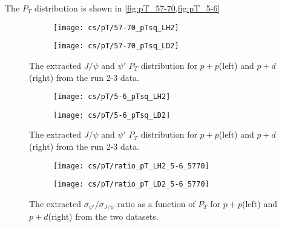 \documentclass[../main.tex]{subfiles}
\begin{document}
The $P_T$ distribution is shown in \cref{fig:pT_57-70,fig:pT_5-6}
\begin{figure}[h!]
	\centering
	\begin{subfigure}{0.45\linewidth}
		\texttt{[image: cs/pT/57-70\_pTsq\_LH2]}
	\end{subfigure}
	\begin{subfigure}{0.45\linewidth}
		\texttt{[image: cs/pT/57-70\_pTsq\_LD2]}
	\end{subfigure}
	\caption{The extracted $J/\psi$ and $\psi'$ $P_T$ distribution for $p+p$(left)
		and $p+d$(right) from the run 2-3 data.}
	\label{fig:pT_57-70}
\end{figure}
\begin{figure}[h!]
	\centering
	\begin{subfigure}{0.45\linewidth}
		\texttt{[image: cs/pT/5-6\_pTsq\_LH2]}
	\end{subfigure}
	\begin{subfigure}{0.45\linewidth}
		\texttt{[image: cs/pT/5-6\_pTsq\_LD2]}
	\end{subfigure}
	\caption{The extracted $J/\psi$ and $\psi'$ $P_T$ distribution for $p+p$(left)
		and $p+d$(right) from the run 2-3 data.}
	\label{fig:pT_5-6}
\end{figure}
\begin{figure}[h!]
	\centering
	\begin{subfigure}{0.45\linewidth}
		\texttt{[image: cs/pT/ratio\_pT\_LH2\_5-6\_5770]}
	\end{subfigure}
	\begin{subfigure}{0.45\linewidth}
		\texttt{[image: cs/pT/ratio\_pT\_LD2\_5-6\_5770]}
	\end{subfigure}
	\caption{The extracted  $\sigma_{\psi'}/\sigma_{J/\psi}$ ratio as a function of $P_T$ for $p+p$(left)
		and $p+d$(right) from the two datasets.}
\end{figure}
\end{document}
